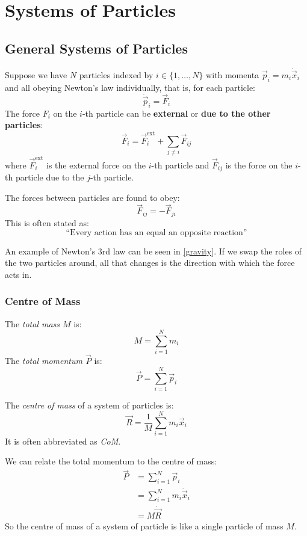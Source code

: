 \documentclass[../main.tex]{subfiles}
\begin{document}
\chapter{Systems of Particles}
\label{systemsOfParticles}
\section{General Systems of Particles}
Suppose we have $N$ particles indexed by $i \in \{1, \ldots, N\}$ with momenta $\vec{p}_i = m_i \dot{\vec{x}}_i$ and all obeying Newton's law individually, that is, for each particle:
\[
  \dot{\vec{p}}_i = \vec{F}_i
\]
The force $F_i$ on the $i$-th particle can be \textbf{external} or \textbf{due to the other particles}:
\[
  \vec{F}_i = \vec{F}^{\text{ext}}_i + \sum_{j \neq i} \vec{F}_{ij}
\]
where $\vec{F}^{\text{ext}}_i$ is the external force on the $i$-th particle and $\vec{F}_{ij}$ is the force on the $i$-th particle due to the $j$-th particle.

\begin{law}
  The forces between particles are found to obey:
  \label{newtonsThird}
  \[
    \vec{F}_{ij} = - \vec{F}_{ji}
  \]
  This is often stated as:
  \[
    \text{``Every action has an equal an opposite reaction''}
  \]
\end{law}
\begin{remark}
  An example of Newton's 3rd law can be seen in \cref{gravity}.
  If we swap the roles of the two particles around, all that changes is the direction with which the force acts in.
\end{remark}
\subsection{Centre of Mass}
\begin{definition}
  The \textit{total mass $M$} is:
  \[
    M = \sum_{i = 1}^{N} m_i
  \]
  The \textit{total momentum $\vec{P}$} is:
  \[
    \vec{P} = \sum_{i = 1}^{N} \vec{p}_i
  \]
\end{definition}
\begin{definition}
  The \textit{centre of mass} of a system of particles is:
  \[
    \vec{R} = \frac{1}{M}\sum_{i = 1}^{N} m_i\vec{x}_i
  \]
  It is often abbreviated as \textit{CoM}.
\end{definition}
We can relate the total momentum to the centre of mass:
\begin{align*}
  \vec{P} &= \sum_{i = 1}^{N} \vec{p}_i \\
          &= \sum_{i = 1}^{N} m_i \dot{\vec{x}}_i \\
          &= M \dot{\vec{R}}
\end{align*}
So the centre of mass of a system of particle is like a single particle of mass $M$.
\end{document}

